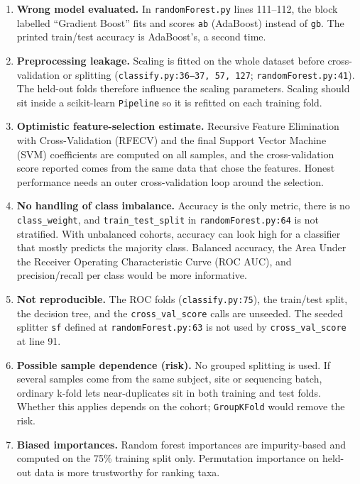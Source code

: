 \documentclass[11pt,a4paper]{article}
\newcommand{\code}[1]{\texttt{\small #1}}
\begin{document}
\begin{enumerate}
  \item \textbf{Wrong model evaluated.} In \code{randomForest.py} lines 111--112, the block labelled ``Gradient Boost''
        fits and scores \code{ab} (AdaBoost) instead of \code{gb}. The printed train/test accuracy is AdaBoost's, a second time.
  \item \textbf{Preprocessing leakage.} Scaling is fitted on the whole dataset before cross-validation or splitting
        (\code{classify.py:36--37, 57, 127}; \code{randomForest.py:41}). The held-out folds therefore influence the scaling
        parameters. Scaling should sit inside a scikit-learn \code{Pipeline} so it is refitted on each training fold.
  \item \textbf{Optimistic feature-selection estimate.} Recursive Feature Elimination with Cross-Validation (RFECV) and the final
        Support Vector Machine (SVM) coefficients are computed on all samples, and the cross-validation score reported comes from
        the same data that chose the features. Honest performance needs an outer cross-validation loop around the selection.
  \item \textbf{No handling of class imbalance.} Accuracy is the only metric, there is no \code{class\_weight}, and
        \code{train\_test\_split} in \code{randomForest.py:64} is not stratified. With unbalanced cohorts, accuracy can look high
        for a classifier that mostly predicts the majority class. Balanced accuracy, the Area Under the Receiver Operating
        Characteristic Curve (ROC AUC), and precision/recall per class would be more informative.
  \item \textbf{Not reproducible.} The ROC folds (\code{classify.py:75}), the train/test split, the decision tree, and the
        \code{cross\_val\_score} calls are unseeded. The seeded splitter \code{sf} defined at \code{randomForest.py:63} is not
        used by \code{cross\_val\_score} at line 91.
  \item \textbf{Possible sample dependence (risk).} No grouped splitting is used. If several samples come from the same subject,
        site or sequencing batch, ordinary k-fold lets near-duplicates sit in both training and test folds. Whether this applies
        depends on the cohort; \code{GroupKFold} would remove the risk.
  \item \textbf{Biased importances.} Random forest importances are impurity-based and computed on the 75\% training split only.
        Permutation importance on held-out data is more trustworthy for ranking taxa.
\end{enumerate}
\end{document}
